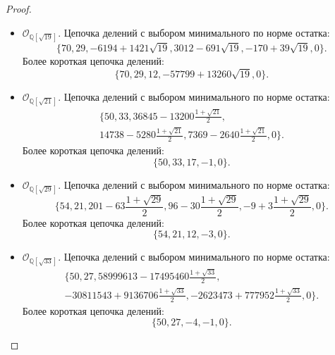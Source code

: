 \documentclass[_00_dissertation.tex]{subfiles}
\begin{document}
\begin{proof}
\begin{itemize}
        \item $\mathcal{O}_{\mathbb{Q}[\sqrt{19}]}$.
        Цепочка делений с выбором минимального по норме остатка:
        \begin{equation*}
            \{70, 29, -6194+1421\sqrt{19}, 3012-691\sqrt{19}, -170+39\sqrt{19}, 0\}.
        \end{equation*}
        Более короткая цепочка делений:
        \begin{equation*}
            \{70, 29, 12, -57799+13260\sqrt{19}, 0\}.
        \end{equation*}
    
        \item $\mathcal{O}_{\mathbb{Q}[\sqrt{21}]}$.
        Цепочка делений с выбором минимального по норме остатка:
        \begin{multline*}
          \{50, 33, 36845-13200\frac{1+\sqrt{21}}{2},\\
          14738-5280\frac{1+\sqrt{21}}{2}, 7369-2640\frac{1+\sqrt{21}}{2}, 0\}.
        \end{multline*}
        Более короткая цепочка делений:
        \begin{equation*}
            \{50, 33, 17, -1, 0\}.
        \end{equation*}
    
        \item $\mathcal{O}_{\mathbb{Q}[\sqrt{29}]}$.
        Цепочка делений с выбором минимального по норме остатка:
        \begin{equation*}
            \{54, 21, 201-63\frac{1+\sqrt{29}}{2}, 96-30\frac{1+\sqrt{29}}{2}, -9+3\frac{1+\sqrt{29}}{2}, 0\}.
        \end{equation*}
        Более короткая цепочка делений:
        \begin{equation*}
            \{54, 21, 12, -3, 0\}.
        \end{equation*}
    
        \item $\mathcal{O}_{\mathbb{Q}[\sqrt{33}]}$.
        Цепочка делений с выбором минимального по норме остатка:
        \begin{multline*}
            \{50, 27, 58999613-17495460\frac{1+\sqrt{33}}{2},\\
            -30811543+9136706\frac{1+\sqrt{33}}{2}, -2623473+777952\frac{1+\sqrt{33}}{2}, 0\}.
        \end{multline*}
        Более короткая цепочка делений:
        \begin{equation*}
            \{50, 27, -4, -1, 0\}.
        \end{equation*}
    

\end{itemize}
\end{proof}
\end{document}
